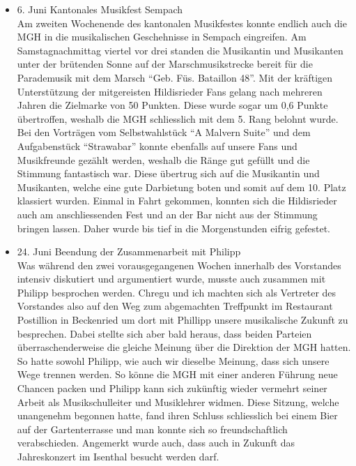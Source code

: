 \begin{history}
\begin{itemize}
            \item 6. Juni Kantonales Musikfest Sempach\\
                  Am zweiten Wochenende des kantonalen Musikfestes konnte
                  endlich auch die MGH in die musikalischen Geschehnisse in
                  Sempach eingreifen. Am Samstagnachmittag viertel vor drei
                  standen die Musikantin und Musikanten unter der brütenden
                  Sonne auf der Marschmusikstrecke bereit für die Parademusik
                  mit dem Marsch \enquote{Geb. Füs. Bataillon 48}. Mit der
                  kräftigen Unterstützung der mitgereisten Hildisrieder Fans
                  gelang nach mehreren Jahren die Zielmarke von 50 Punkten.
                  Diese wurde sogar um 0,6 Punkte übertroffen, weshalb die MGH
                  schliesslich mit dem 5. Rang belohnt wurde.  Bei den Vorträgen
                  vom Selbstwahlstück \enquote{A Malvern Suite} und dem
                  Aufgabenstück \enquote{Strawabar} konnte ebenfalls auf unsere
                  Fans und Musikfreunde gezählt werden, weshalb die Ränge gut
                  gefüllt und die Stimmung fantastisch war.  Diese übertrug sich
                  auf die Musikantin und Musikanten, welche eine gute Darbietung
                  boten und somit auf dem 10. Platz klassiert wurden. Einmal in
                  Fahrt gekommen, konnten sich die Hildisrieder auch am
                  anschliessenden Fest und an der Bar nicht aus der Stimmung
                  bringen lassen. Daher wurde bis tief in die Morgenstunden
                  eifrig gefestet.

            \item 24. Juni Beendung der Zusammenarbeit mit Philipp\\
                  Was während den zwei vorausgegangenen Wochen innerhalb des
                  Vorstandes intensiv diskutiert und argumentiert wurde, musste
                  auch zusammen mit Philipp besprochen werden. Chregu und ich
                  machten sich als Vertreter des Vorstandes also auf den Weg zum
                  abgemachten Treffpunkt im Restaurant Postillion in Beckenried
                  um dort mit Phillipp unsere musikalische Zukunft zu
                  besprechen. Dabei stellte sich aber bald heraus, dass beiden
                  Parteien überraschenderweise die gleiche Meinung über die
                  Direktion der MGH hatten. So hatte sowohl Philipp, wie auch
                  wir dieselbe Meinung, dass sich unsere Wege trennen werden. So
                  könne die MGH mit einer anderen Führung neue Chancen packen
                  und Philipp kann sich zukünftig wieder vermehrt seiner Arbeit
                  als Musikschulleiter und Musiklehrer widmen. Diese Sitzung,
                  welche unangenehm begonnen hatte, fand ihren Schluss
                  schliesslich bei einem Bier auf der Gartenterrasse und man
                  konnte sich so freundschaftlich verabschieden. Angemerkt wurde
                  auch, dass auch in Zukunft das Jahreskonzert im Isenthal
                  besucht werden darf.


\end{itemize}
\end{history}
